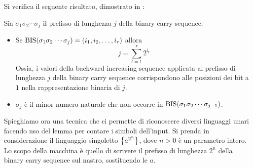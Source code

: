 Si verifica il seguente risultato, dimostrato in \cite{Pighizzini:19:limitedunary}:
\begin{lemma}\label{lem:wit:bis}
	Sia $\sigma_1\sigma_2\cdots\sigma_j$ il prefisso di lunghezza $j$ della binary carry sequence.
	\begin{itemize}
		\item \label{lem:wit:bis:1} Se $\mathrm{BIS}(\sigma_1\sigma_2\cdots\sigma_j)=(i_1,i_2,\dots,i_r)$ allora
		      \begin{equation*}
			      j=\sum_{t=1}^r 2^{i_t}
		      \end{equation*}
		      Ossia, i valori della backward increasing sequence applicata al prefisso di lunghezza $j$ della binary carry sequence corrispondono alle posizioni dei bit a $1$ nella rappresentazione binaria di $j$.
		\item \label{lem:wit:bis:2} $\sigma_j$ è il minor numero naturale che non occorre in $\mathrm{BIS}(\sigma_1\sigma_2\cdots\sigma_{j-1})$.
	\end{itemize}
\end{lemma}

Spieghiamo ora una tecnica che ci permette di riconoscere diversi linguaggi unari facendo uso del lemma per contare i simboli dell'input. Si prenda in considerazione il linguaggio singoletto $\left\{ a^{2^n} \right\}$, dove $n>0$ è un parametro intero. Lo scopo della macchina è quello di scrivere il prefisso di lunghezza $2^n$ della binary carry sequence sul nastro, sostituendo le $a$.

